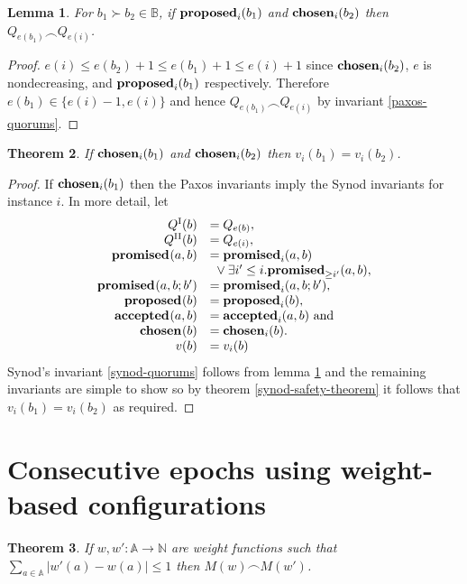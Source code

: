 \documentclass[journal]{IEEEtran}
\newtheorem{theorem}{Theorem}
\newtheorem{lemma}[theorem]{Lemma}
\begin{document}
\begin{lemma}\label{paxos-synod-quorum-invariant} For $b_1 \succ b_2 \in
\mathbb B$, if $\mathbf{proposed}_{i}(b_1)$ and $\mathbf{chosen}_{i}(b_2)$ then ${Q_{e(b_1)} \frown
Q_{e(i)}}$.  \end{lemma}

\begin{proof} $e(i) \le e(b_2) + 1 \le e(b_1) + 1 \le e(i) + 1$ since
$\mathbf{chosen}_{i}(b_2)$, $e$ is nondecreasing, and $\mathbf{proposed}_{i}(b_1)$ respectively.
Therefore $e(b_1) \in \{ e(i) - 1, e(i) \}$ and hence ${Q_{e(b_1)} \frown
Q_{e(i)}}$ by invariant \ref{paxos-quorums}.  \end{proof}

\begin{theorem}\label{paxos-safety-theorem} If $\mathbf{chosen}_{i}(b_1)$ and
$\mathbf{chosen}_{i}(b_2)$ then ${v_i(b_1) = v_i(b_2)}$.  \end{theorem}

\begin{proof} If $\mathbf{chosen}_{i}(b_1)$ then the Paxos invariants imply the Synod
invariants for instance $i$.  In more detail, let
\[\begin{array}{rl}
Q^\textrm{I}(b) &= Q_{e(b)}, \\
Q^\textrm{II}(b) &= Q_{e(i)}, \\
\mathbf{promised}_{}(a,b) &= \mathbf{promised}_{i}(a,b) \\
& \ {}\vee \exists i' \le i. \mathbf{promised}_{\ge i'}(a,b), \\
\mathbf{promised}_{}(a,b;b') &= \mathbf{promised}_{i}(a,b;b'), \\
\mathbf{proposed}_{}(b) &= \mathbf{proposed}_{i}(b), \\
\mathbf{accepted}_{}(a,b) &= \mathbf{accepted}_{i}(a,b) \textrm{ and} \\
\mathbf{chosen}_{}(b) &= \mathbf{chosen}_{i}(b). \\
v(b) &= v_i(b)\\
\end{array}
\]
Synod's invariant \ref{synod-quorums} follows from lemma
\ref{paxos-synod-quorum-invariant} and the remaining invariants are simple to
show so by theorem \ref{synod-safety-theorem} it follows that $v_i(b_1) =
v_i(b_2)$ as required.  \end{proof}

\section{Consecutive epochs using weight-based configurations}

\begin{theorem} \label{weights-nearly-equal} If $w, w' : \mathbb A \to \mathbb
N$ are weight functions such that $\sum_{a \in \mathbb A} |w'(a) - w(a)| \le 1$
then $M(w) \frown M(w')$.  \end{theorem}
\end{document}
